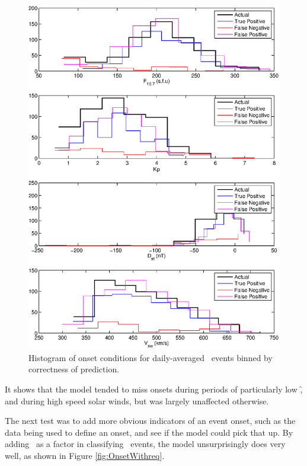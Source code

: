 \begin{figure}[htp!]
	\centering
	\includegraphics[width=0.85\linewidth]{Figures/CH5/NNBinaryOnset-daily-hist.eps}
	\caption{Histogram of onset conditions for daily-averaged \req\ events binned by correctness of prediction.}
	\label{fig:OnsetEventsHist}
\end{figure}

It shows that the model tended to miss onsets during periods of particularly low \f, and during high speed solar winds, but was largely unaffected otherwise.

The next test was to add more obvious indicators of an event onset, such as the data being used to define an onset, and see if the model could pick that up. By adding \req\ as a factor in classifying \req\ events, the model unsurprisingly does very well, as shown in Figure \ref{fig:OnsetWithreq}.

